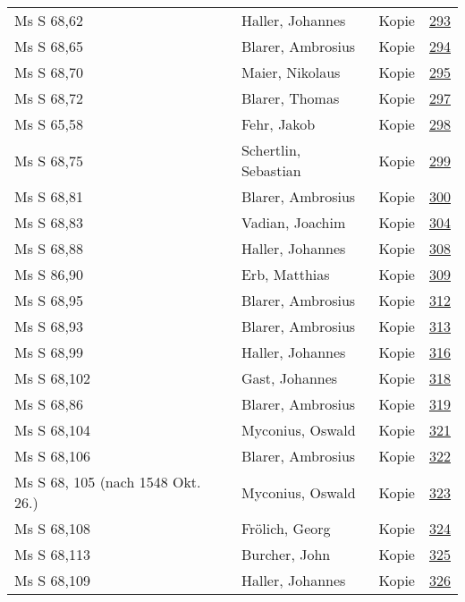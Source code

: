 \documentclass[10pt,a4paper,landscape]{report}
\begin{document}
\begin{longtable}{p{16cm}p{4cm}lr}
Ms S 68,62	&	Haller, Johannes	&	Kopie	&	\href{http://130.60.24.72/assignment/293}{293}\\
Ms S 68,65	&	Blarer, Ambrosius	&	Kopie	&	\href{http://130.60.24.72/assignment/294}{294}\\
Ms S 68,70	&	Maier, Nikolaus	&	Kopie	&	\href{http://130.60.24.72/assignment/295}{295}\\
Ms S 68,72	&	Blarer, Thomas	&	Kopie	&	\href{http://130.60.24.72/assignment/297}{297}\\
Ms S 65,58	&	Fehr, Jakob	&	Kopie	&	\href{http://130.60.24.72/assignment/298}{298}\\
Ms S 68,75	&	Schertlin, Sebastian	&	Kopie	&	\href{http://130.60.24.72/assignment/299}{299}\\
Ms S 68,81	&	Blarer, Ambrosius	&	Kopie	&	\href{http://130.60.24.72/assignment/300}{300}\\
Ms S 68,83	&	Vadian, Joachim	&	Kopie	&	\href{http://130.60.24.72/assignment/304}{304}\\
Ms S 68,88	&	Haller, Johannes	&	Kopie	&	\href{http://130.60.24.72/assignment/308}{308}\\
Ms S 86,90	&	Erb, Matthias	&	Kopie	&	\href{http://130.60.24.72/assignment/309}{309}\\
Ms S 68,95	&	Blarer, Ambrosius	&	Kopie	&	\href{http://130.60.24.72/assignment/312}{312}\\
Ms S 68,93	&	Blarer, Ambrosius	&	Kopie	&	\href{http://130.60.24.72/assignment/313}{313}\\
Ms S 68,99	&	Haller, Johannes	&	Kopie	&	\href{http://130.60.24.72/assignment/316}{316}\\
Ms S 68,102	&	Gast, Johannes	&	Kopie	&	\href{http://130.60.24.72/assignment/318}{318}\\
Ms S 68,86	&	Blarer, Ambrosius	&	Kopie	&	\href{http://130.60.24.72/assignment/319}{319}\\
Ms S 68,104	&	Myconius, Oswald	&	Kopie	&	\href{http://130.60.24.72/assignment/321}{321}\\
Ms S 68,106	&	Blarer, Ambrosius	&	Kopie	&	\href{http://130.60.24.72/assignment/322}{322}\\
Ms S 68, 105 (nach 1548 Okt. 26.)	&	Myconius, Oswald	&	Kopie	&	\href{http://130.60.24.72/assignment/323}{323}\\
Ms S 68,108	&	Frölich, Georg	&	Kopie	&	\href{http://130.60.24.72/assignment/324}{324}\\
Ms S 68,113	&	Burcher, John	&	Kopie	&	\href{http://130.60.24.72/assignment/325}{325}\\
Ms S 68,109	&	Haller, Johannes	&	Kopie	&	\href{http://130.60.24.72/assignment/326}{326}\\

\end{longtable}
\end{document}
